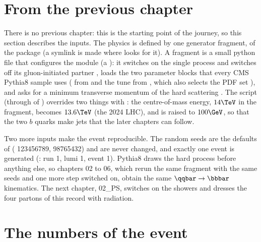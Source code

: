 \section{From the previous chapter}

There is no previous chapter: this is the starting point of the journey, so this section describes the
inputs. The physics is defined by one generator fragment,
 of the package (a symlink is made where
 looks for it). A fragment is a small python file that configures the 
module (a ): it switches on the single process
 and switches off its gluon-initiated partner , loads the
two parameter blocks that every CMS Pythia8 sample uses ( from
 and the tune 
from , which also selects the
PDF set ), and asks for a minimum transverse momentum of the hard scattering
. The script  (through  of
) overrides two things with : the
centre-of-mass energy, $14\TeV$ in the fragment, becomes $13.6\TeV$ (the 2024 LHC), and \ptHat{} is
raised to $100\GeV$, so that the two $b$ quarks make jets that the later chapters can follow.

Two more inputs make the event reproducible. The random seeds are the defaults of
 ( 123456789,  98765432) and
are never changed, and exactly one event is generated (: run 1, lumi 1, event 1). Pythia8
draws the hard process before anything else, so chapters 02 to 06, which rerun the same fragment with the
same seeds and one more step switched on, obtain the same $\qqbar\to\bbbar$ kinematics. The next
chapter, 02\_PS, switches on the showers and dresses the four partons of this record with radiation.

\section{The numbers of the event}

